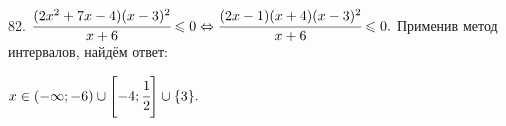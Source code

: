 82. $\cfrac{(2x^2+7x-4)(x-3)^2}{x+6}\leqslant0\Leftrightarrow\cfrac{(2x-1)(x+4)(x-3)^2}{x+6}\leqslant0.$
Применив метод интервалов, найдём ответ:
\begin{figure}[ht!]
\end{figure}
$x\in(-\infty;-6)\cup\left[-4;\cfrac{1}{2}\right]\cup\{3\}.$\newpage\noindent
